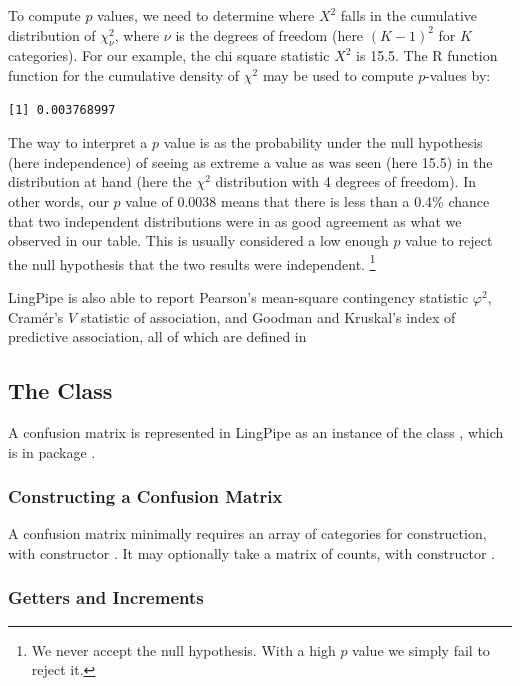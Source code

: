 To compute $p$ values, we need to determine where $X^2$ falls in the
cumulative distribution of $\chi^2_{\nu}$, where $\nu$ is the degrees
of freedom (here $(K-1)^2$ for $K$ categories).  For our example, the
chi square statistic $X^2$ is 15.5.  The R function function
 for the cumulative density of $\chi^2$ may be used to
compute $p$-values by:
%
\begin{verbatim}
[1] 0.003768997

\end{verbatim}
%
The way to interpret a $p$ value is as the probability under the null
hypothesis (here independence) of seeing as extreme a value as was
seen (here 15.5) in the distribution at hand (here the $\chi^2$
distribution with 4 degrees of freedom).  In other words, our $p$
value of 0.0038 means that there is less than a 0.4\% chance that
two independent distributions were in as good agreement as what we
observed in our table.  This is usually considered a low enough
$p$ value to reject the null hypothesis that the two results
were independent.%
%
\footnote{We never accept the null hypothesis.  With a high $p$ value
  we simply fail to reject it.}

LingPipe is also able to report Pearson's mean-square contingency
statistic $\varphi^2$, Cramér's $V$ statistic of association, and
Goodman and Kruskal's index of predictive association, all of which
are defined in 

\subsection{The  Class}

A confusion matrix is represented in LingPipe as an instance of the
class , which is in package
.  

\subsubsection{Constructing a Confusion Matrix}

A confusion matrix minimally requires an array of categories for
construction, with constructor .  It
may optionally take a matrix of counts, with constructor
.

\subsubsection{Getters and Increments}

